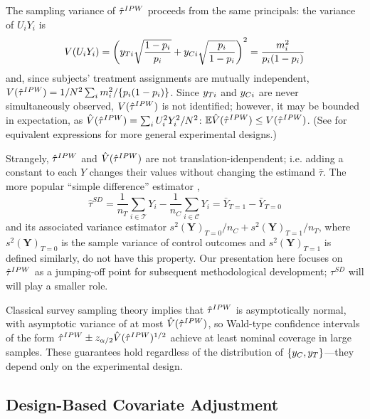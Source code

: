 \sloppy
The sampling variance of $\hat{\tau}^{IPW}$ proceeds from the same principals:
the variance of $U_iY_i$ is
\begin{equation}\label{eq:varTauHat1}
V(U_iY_i)=\left(y_{Ti}\sqrt{\frac{1-p_i}{p_i}}+y_{Ci}\sqrt{\frac{p_i}{1-p_i}}\right)^2=\frac{m_i^2}{p_i(1-p_i)}
\end{equation}
and, since  subjects' treatment assignments are mutually independent,
$V(\hat{\tau}^{IPW})=1/N^2\sum_im_i^2/\{p_i(1-p_i)\}$.
Since $y_{Ti} $ and $y_{Ci} $ are never simultaneously observed,
$V(\hat{\tau}^{IPW})$ is not identified; however, it may be bounded in expectation,
as $\hat{V}(\hat{\tau}^{IPW})=\sum_iU_i^2Y_i^2/N^2$:
$\mathbb{E}\hat{V}(\hat{\tau}^{IPW})\le V(\hat{\tau}^{IPW})$.
(See \citealt{aronowMiddleton} for equivalent expressions for more
general experimental designs.)

Strangely, $\hat{\tau}^{IPW}$ and $\hat{V}(\hat{\tau}^{IPW})$ are not translation-idenpendent;
i.e. adding a constant to each $Y$ changes their values without
changing the estimand $\bar{\tau}$.
The more popular ``simple difference'' estimator \citep{neyman:1923},
\begin{equation}\label{eq:tauSD}
\hat{\tau}^{SD} = \frac{1}{n_T}\sum_{i \in \mathcal{T}}Y_i - \frac{1}{n_C}\sum_{i \in \mathcal{C}}Y_i=\bar{Y}_{T=1}-\bar{Y}_{T=0}
\end{equation}
and its associated variance estimator
$s^2(\bm{Y})_{T=0}/n_C+s^2(\bm{Y})_{T=1}/n_T$, where
$s^2(\bm{Y})_{T=0}$ is the sample variance of control outcomes
and
$s^2(\bm{Y})_{T=1}$ is defined similarly, do not have this property.
Our presentation here focuses on $\hat{\tau}^{IPW}$ as a jumping-off point for
subsequent methodological development;
$\tau^{SD}$ will will play a smaller role.


Classical survey sampling theory implies that $\hat{\tau}^{IPW}$ is
asymptotically normal, with asymptotic variance of at most
$\hat{V}(\hat{\tau}^{IPW})$, so Wald-type confidence intervals of the form
$\hat{\tau}^{IPW}\pm z_{\alpha/2}\hat{V}(\hat{\tau}^{IPW})^{1/2}$ achieve at least nominal coverage
in large samples.
These guarantees hold regardless of the distribution of
$\{y_C,y_T\}$---they depend only on the experimental design.



\subsection{Design-Based Covariate Adjustment}

